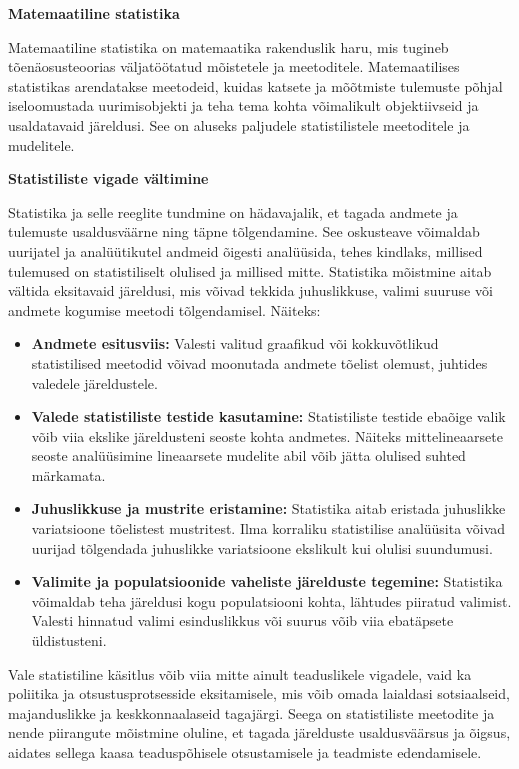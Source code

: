 \documentclass[
]{book}
\providecommand{\tightlist}{%
  \setlength{\itemsep}{0pt}\setlength{\parskip}{0pt}}
\begin{document}
\textbf{Matemaatiline statistika}

Matemaatiline statistika on matemaatika rakenduslik haru, mis tugineb tõenäosusteoorias väljatöötatud mõistetele ja meetoditele. Matemaatilises statistikas arendatakse meetodeid, kuidas katsete ja mõõtmiste tulemuste põhjal iseloomustada uurimisobjekti ja teha tema kohta võimalikult objektiivseid ja usaldatavaid järeldusi. See on aluseks paljudele statistilistele meetoditele ja mudelitele.

\textbf{Statistiliste vigade vältimine}

Statistika ja selle reeglite tundmine on hädavajalik, et tagada andmete ja tulemuste usaldusväärne ning täpne tõlgendamine. See oskusteave võimaldab uurijatel ja analüütikutel andmeid õigesti analüüsida, tehes kindlaks, millised tulemused on statistiliselt olulised ja millised mitte. Statistika mõistmine aitab vältida eksitavaid järeldusi, mis võivad tekkida juhuslikkuse, valimi suuruse või andmete kogumise meetodi tõlgendamisel. Näiteks:

\begin{itemize}
\tightlist
\item
  \textbf{Andmete esitusviis:} Valesti valitud graafikud või kokkuvõtlikud statistilised meetodid võivad moonutada andmete tõelist olemust, juhtides valedele järeldustele.
\item
  \textbf{Valede statistiliste testide kasutamine:} Statistiliste testide ebaõige valik võib viia ekslike järeldusteni seoste kohta andmetes. Näiteks mittelineaarsete seoste analüüsimine lineaarsete mudelite abil võib jätta olulised suhted märkamata.
\item
  \textbf{Juhuslikkuse ja mustrite eristamine:} Statistika aitab eristada juhuslikke variatsioone tõelistest mustritest. Ilma korraliku statistilise analüüsita võivad uurijad tõlgendada juhuslikke variatsioone ekslikult kui olulisi suundumusi.
\item
  \textbf{Valimite ja populatsioonide vaheliste järelduste tegemine:} Statistika võimaldab teha järeldusi kogu populatsiooni kohta, lähtudes piiratud valimist. Valesti hinnatud valimi esinduslikkus või suurus võib viia ebatäpsete üldistusteni.
\end{itemize}

Vale statistiline käsitlus võib viia mitte ainult teaduslikele vigadele, vaid ka poliitika ja otsustusprotsesside eksitamisele, mis võib omada laialdasi sotsiaalseid, majanduslikke ja keskkonnaalaseid tagajärgi. Seega on statistiliste meetodite ja nende piirangute mõistmine oluline, et tagada järelduste usaldusväärsus ja õigsus, aidates sellega kaasa teaduspõhisele otsustamisele ja teadmiste edendamisele.
\end{document}
